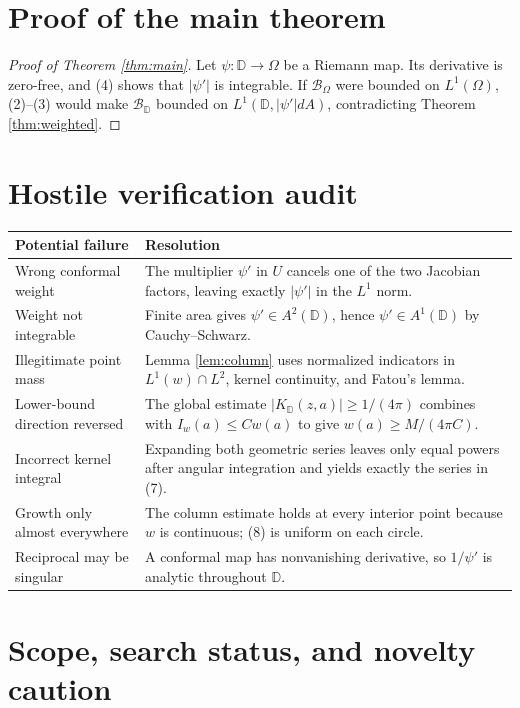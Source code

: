 \documentclass[11pt]{article}
\newcommand{\D}{\mathbb D}
\newcommand{\Berg}{\mathcal B}
\begin{document}
\section*{Proof of the main theorem}

\begin{proof}[Proof of Theorem \ref{thm:main}]
Let $\psi:\D\to\Omega$ be a Riemann map.  Its derivative is zero-free,
and (4) shows that $|\psi'|$ is integrable.  If $\Berg_\Omega$ were bounded
on $L^1(\Omega)$, (2)--(3) would make $\Berg_{\D}$ bounded on
$L^1(\D,|\psi'|dA)$, contradicting Theorem \ref{thm:weighted}.
\end{proof}

\section*{Hostile verification audit}

\begin{center}
\begin{tabular}{p{}p{}}
\toprule
Potential failure & Resolution \\
\midrule
Wrong conformal weight & The multiplier $\psi'$ in $U$ cancels one of the
two Jacobian factors, leaving exactly $|\psi'|$ in the $L^1$ norm. \\
Weight not integrable & Finite area gives $\psi'\in A^2(\D)$, hence
$\psi'\in A^1(\D)$ by Cauchy--Schwarz. \\
Illegitimate point mass & Lemma \ref{lem:column} uses normalized indicators
in $L^1(w)\cap L^2$, kernel continuity, and Fatou's lemma. \\
Lower-bound direction reversed & The global estimate
$|K_{\D}(z,a)|\ge1/(4\pi)$ combines with $I_w(a)\le Cw(a)$ to give
$w(a)\ge M/(4\pi C)$. \\
Incorrect kernel integral & Expanding both geometric series leaves only
equal powers after angular integration and yields exactly the series in (7). \\
Growth only almost everywhere & The column estimate holds at every interior
point because $w$ is continuous; (8) is uniform on each circle. \\
Reciprocal may be singular & A conformal map has nonvanishing derivative, so
$1/\psi'$ is analytic throughout $\D$. \\
\bottomrule
\end{tabular}
\end{center}

\section*{Scope, search status, and novelty caution}
\end{document}
